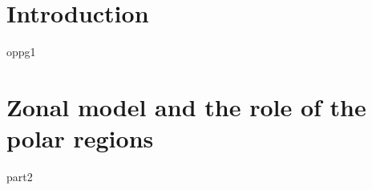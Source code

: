 \documentclass{article}
\begin{document}
\section{Introduction}
{oppg1}

\section{Zonal model and the role of the polar regions}
{part2}
\end{document}
